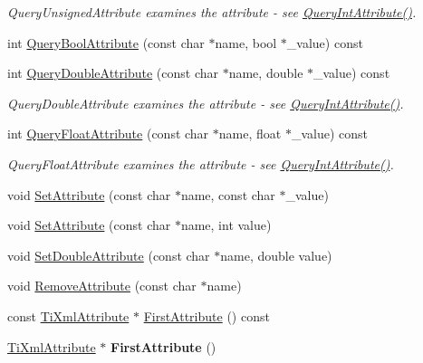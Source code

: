 \begin{DoxyCompactItemize}
\begin{DoxyCompactList}\small\item\em \-Query\-Unsigned\-Attribute examines the attribute -\/ see \hyperlink{class_ti_xml_element_aea0bfe471380f281c5945770ddbf52b9}{\-Query\-Int\-Attribute()}. \end{DoxyCompactList}\item 
int \hyperlink{class_ti_xml_element_af4a1d3f88c28eb0f3115dc39ebd83fff}{\-Query\-Bool\-Attribute} (const char $\ast$name, bool $\ast$\-\_\-value) const 
\item 
\hypertarget{class_ti_xml_element_a898d7730ecc341f0bffc7a9dadbf1ce7}{
int \hyperlink{class_ti_xml_element_a898d7730ecc341f0bffc7a9dadbf1ce7}{\-Query\-Double\-Attribute} (const char $\ast$name, double $\ast$\-\_\-value) const }
\label{class_ti_xml_element_a898d7730ecc341f0bffc7a9dadbf1ce7}

\begin{DoxyCompactList}\small\item\em \-Query\-Double\-Attribute examines the attribute -\/ see \hyperlink{class_ti_xml_element_aea0bfe471380f281c5945770ddbf52b9}{\-Query\-Int\-Attribute()}. \end{DoxyCompactList}\item 
\hypertarget{class_ti_xml_element_aa04d3af11601ef5a5f88295203a843be}{
int \hyperlink{class_ti_xml_element_aa04d3af11601ef5a5f88295203a843be}{\-Query\-Float\-Attribute} (const char $\ast$name, float $\ast$\-\_\-value) const }
\label{class_ti_xml_element_aa04d3af11601ef5a5f88295203a843be}

\begin{DoxyCompactList}\small\item\em \-Query\-Float\-Attribute examines the attribute -\/ see \hyperlink{class_ti_xml_element_aea0bfe471380f281c5945770ddbf52b9}{\-Query\-Int\-Attribute()}. \end{DoxyCompactList}\item 
void \hyperlink{class_ti_xml_element_abf0b3bd7f0e4c746a89ec6e7f101fc32}{\-Set\-Attribute} (const char $\ast$name, const char $\ast$\-\_\-value)
\item 
void \hyperlink{class_ti_xml_element_ace6f4be75e373726d4774073d666d1a7}{\-Set\-Attribute} (const char $\ast$name, int value)
\item 
void \hyperlink{class_ti_xml_element_a0d1dd975d75496778177e35abfe0ec0b}{\-Set\-Double\-Attribute} (const char $\ast$name, double value)
\item 
void \hyperlink{class_ti_xml_element_a56979767deca794376b1dfa69a525b2a}{\-Remove\-Attribute} (const char $\ast$name)
\item 
const \hyperlink{class_ti_xml_attribute}{\-Ti\-Xml\-Attribute} $\ast$ \hyperlink{class_ti_xml_element_a516054c9073647d6cb29b6abe9fa0592}{\-First\-Attribute} () const 
\item 
\hypertarget{class_ti_xml_element_a4b33780fc565d38d6b54f640e0cf1737}{
\hyperlink{class_ti_xml_attribute}{\-Ti\-Xml\-Attribute} $\ast$ {\bfseries \-First\-Attribute} ()}
\label{class_ti_xml_element_a4b33780fc565d38d6b54f640e0cf1737}


\end{DoxyCompactItemize}
